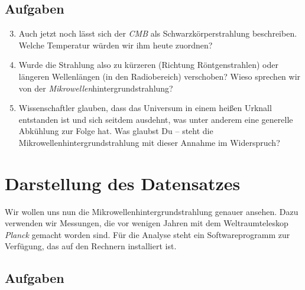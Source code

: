 \documentclass[12pt,twoside,a4paper]{article}
\newcommand{\cmb}{\emph{CMB}\xspace}
\begin{document}
\subsection{Aufgaben}

\begin{enumerate}
  \setcounter{enumi}{2}
\item Auch jetzt noch l\"asst sich der \cmb als
  Schwarzk\"orperstrahlung beschreiben. Welche Temperatur w\"urden wir
  ihm heute zuordnen?
\item Wurde die Strahlung also zu k\"urzeren (Richtung
  R\"ontgenstrahlen) oder l\"angeren Wellenl\"angen (in den
  Radiobereich) verschoben? Wieso sprechen wir von der
  \emph{Mikrowellen}hintergrundstrahlung?
\item Wissenschaftler glauben, dass das Universum in einem hei{\ss}en
  Urknall entstanden ist und sich seitdem ausdehnt, was unter anderem
  eine generelle Abk\"uhlung zur Folge hat. Was glaubst Du -- steht
  die Mikrowellenhintergrundstrahlung mit dieser Annahme im
  Widerspruch?
\end{enumerate}



\section{Darstellung des Datensatzes}

Wir wollen uns nun die Mikrowellenhintergrundstrahlung genauer
ansehen. Dazu verwenden wir Messungen, die vor wenigen Jahren mit dem
Weltraumteleskop \emph{Planck} gemacht worden sind. F\"ur die Analyse
steht ein Softwareprogramm zur Verf\"ugung, das auf den Rechnern
installiert ist.


\subsection{Aufgaben}
\end{document}
